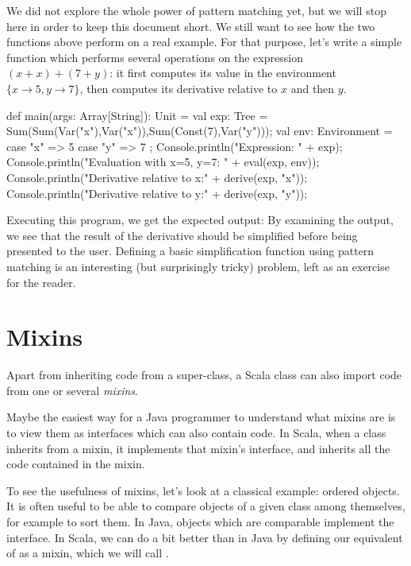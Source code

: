 \documentclass[a4paper,12pt,twoside,titlepage]{article}
\newcommand{\langname}[1]{#1\xspace}
\newcommand{\Scala}{\langname{Scala}}
\newcommand{\Java}{\langname{Java}}
\begin{document}
We did not explore the whole power of pattern matching yet, but we
will stop here in order to keep this document short. We still want to
see how the two functions above perform on a real example. For that
purpose, let's write a simple  function which performs
several operations on the expression $(x+x)+(7+y)$: it first computes
its value in the environment $\{x\rightarrow 5, y\rightarrow 7\}$, then
computes its derivative relative to $x$ and then $y$.
\begin{scalacode}
  def main(args: Array[String]): Unit = {
    val exp: Tree = Sum(Sum(Var("x"),Var("x")),Sum(Const(7),Var("y")));
    val env: Environment = { case "x" => 5 case "y" => 7 };
    Console.println("Expression: " + exp);
    Console.println("Evaluation with x=5, y=7: " + eval(exp, env));
    Console.println("Derivative relative to x:\n " + derive(exp, "x"));
    Console.println("Derivative relative to y:\n " + derive(exp, "y"));
  }
\end{scalacode}
\begin{scalainvisiblecode}
} // object Calculator
\end{scalainvisiblecode}
Executing this program, we get the expected output:
By examining the output, we see that the result of the derivative
should be simplified before being presented to the user. Defining a
basic simplification function using pattern matching is an interesting
(but surprisingly tricky) problem, left as an exercise for the reader.

\section{Mixins}
\label{sec:mixins}

Apart from inheriting code from a super-class, a \Scala class can also
import code from one or several \emph{mixins}.

Maybe the easiest way for a \Java programmer to understand what mixins
are is to view them as interfaces which can also contain code. In
\Scala, when a class inherits from a mixin, it implements that mixin's
interface, and inherits all the code contained in the mixin.

To see the usefulness of mixins, let's look at a classical example:
ordered objects. It is often useful to be able to compare objects of a
given class among themselves, for example to sort them. In \Java,
objects which are comparable implement the 
interface. In \Scala, we can do a bit better than in \Java by defining
our equivalent of  as a mixin, which we will call
.
\end{document}
